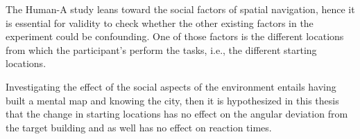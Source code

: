 The Human-A study leans toward the social factors of spatial navigation, hence it is essential for validity to check whether the other existing factors in the experiment could be confounding. One of those factors is the different locations from which the participant's perform the tasks, i.e., the different starting locations. 

Investigating the effect of the social aspects of the environment entails having built a mental map and knowing the city, then it is hypothesized in this thesis that the change in starting locations has no effect on the angular deviation from the target building and as well has no effect on reaction times.
